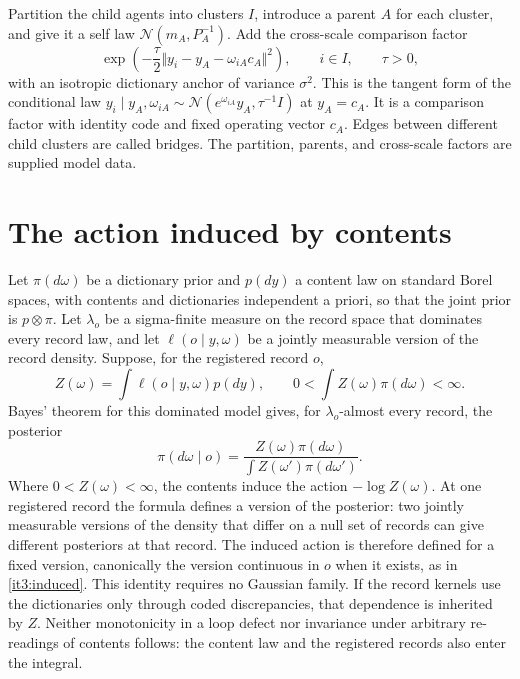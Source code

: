 Partition the child agents into clusters $I$, introduce a parent $A$ for each cluster, and give it a self law $\mathcal N(m_A,P_A^{-1})$. Add the cross-scale comparison factor
\begin{equation}
\exp\left(-\frac{\tau}{2}\Vert y_i-y_A-\omega_{iA}c_A\Vert^2\right),
\qquad i\in I,\qquad \tau>0,
\label{it3:top-down}
\end{equation}
with an isotropic dictionary anchor of variance $\sigma^2$. This is the tangent form of the conditional law $y_i\mid y_A,\omega_{iA}\sim\mathcal N(e^{\omega_{iA}}y_A,\tau^{-1}I)$ at $y_A=c_A$. It is a comparison factor with identity code and fixed operating vector $c_A$. Edges between different child clusters are called bridges. The partition, parents, and cross-scale factors are supplied model data.

\section{The action induced by contents}
\label{it3:ch-induced}

Let $\pi(d\omega)$ be a dictionary prior and $p(dy)$ a content law on standard Borel spaces, with contents and dictionaries independent a priori, so that the joint prior is $p\otimes\pi$. Let $\lambda_o$ be a sigma-finite measure on the record space that dominates every record law, and let $\ell(o\mid y,\omega)$ be a jointly measurable version of the record density. Suppose, for the registered record $o$,
\begin{equation}
Z(\omega)=\int\ell(o\mid y,\omega)p(dy),\qquad
0<\int Z(\omega)\pi(d\omega)<\infty.
\end{equation}
Bayes' theorem for this dominated model gives, for $\lambda_o$-almost every record, the posterior
\begin{equation}
\pi(d\omega\mid o)
=\frac{Z(\omega)\pi(d\omega)}{\int Z(\omega')\pi(d\omega')}.
\end{equation}
Where $0<Z(\omega)<\infty$, the contents induce the action $-\log Z(\omega)$. At one registered record the formula defines a version of the posterior: two jointly measurable versions of the density that differ on a null set of records can give different posteriors at that record. The induced action is therefore defined for a fixed version, canonically the version continuous in $o$ when it exists, as in \cref{it3:induced}. This identity requires no Gaussian family. If the record kernels use the dictionaries only through coded discrepancies, that dependence is inherited by $Z$. Neither monotonicity in a loop defect nor invariance under arbitrary re-readings of contents follows: the content law and the registered records also enter the integral.

